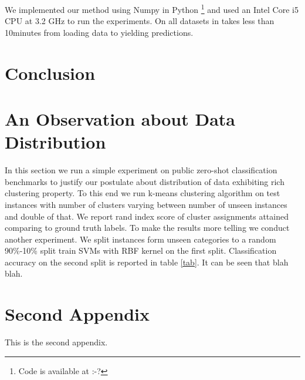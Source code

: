 \documentclass[wcp]{jmlr}
\begin{document}
We implemented our method using Numpy \cite{} in Python
\footnote{Code is available at :-?}
 and used an Intel Core i5 CPU at 3.2 GHz to run the experiments.
On all datasets in takes less than 10minutes from loading data to yielding predictions.

\section{Conclusion}




%
%


%


\appendix

\section{An Observation about Data Distribution}\label{observation}
In this section we run a simple experiment on public zero-shot classification benchmarks to justify our
postulate about distribution of data exhibiting rich clustering property. To this end we run k-means clustering
algorithm on test instances with number of clusters varying between number of unseen instances and double of that.
We report rand index score of cluster assignments attained comparing to ground truth labels.
To make the results more telling we conduct another experiment. We split instances form unseen categories
to a random 90\%-10\% split train SVMs with RBF kernel on the first split. Classification accuracy on the second split is reported in table \ref{tab}.
It can be seen that blah blah.%

\section{Second Appendix}\label{apd:second}

This is the second appendix.
\end{document}
